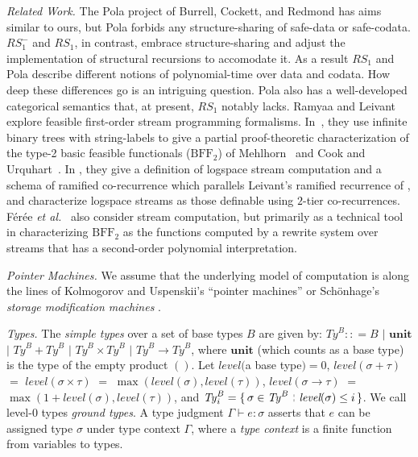 \documentclass[envcountsame]{llncs}
\newcommand{\Unit}{\ensuremath{\mathbf{unit}}\xspace}
\newcommand{\Ty}{\mathit{Ty}}
\newcommand{\RSi}{\mathit{RS_1}}
\newcommand{\RSmi}{\mathit{RS^-_1}}
\newcommand{\Topic}[1]{\smallskip\noindent{\textbf{#1{.}}}\enspace}
\newcommand{\set}[1]{\{\,#1\,\}}
\newcommand{\entails}{\vdash}
\newcommand{\suchthat}{\mathrel{\,\stackrel{\rule{0.03em}{0.5ex}}{\rule[-.1ex]{0.03em}{0.5ex}}\,}}
\newcommand{\is}{\ensuremath{\mathrel{\mathrel{:}\mathrel{:}=}}}
\newcommand{\of}{\colon}
\renewcommand{\colon}{\mathpunct{:}}
\newcommand{\level}{\textit{level}}
\begin{document}
\emph{Related Work.}
The Pola project of Burrell, Cockett, and Redmond
\cite{Burrell:2009,cockett:redmond:low:cat} has  aims similar to ours,
but Pola forbids any structure-sharing of safe-data or safe-codata.
$\RSmi$ and $\RSi$, in contrast, embrace structure-sharing and
adjust the implementation of structural recursions to accomodate it.
As a result $\RSi$ and Pola describe different notions of
polynomial-time over data and codata.  
How deep these differences go is an intriguing question.
Pola also has a well-developed categorical
semantics that,  at present, $\RSi$ notably lacks.
Ramyaa and Leivant \cite{Ramyaa:2010,Ramyaa:Leivant:2011} explore
feasible first-order stream programming formalisms.
In~\cite{Ramyaa:2010}, they use infinite binary trees with
string-labels to give a partial proof-theoretic characterization of
the type-2 basic feasible functionals ($\mathrm{BFF}_2$) of
Mehlhorn~\cite{Mehlhorn76} and Cook and
Urquhart~\cite{CookUrquhart:feasConstrArith}.  In
\cite{Ramyaa:Leivant:2011}, they give a definition of logspace
stream computation and a schema of ramified co-recurrence which
parallels Leivant's ramified recurrence of \cite{Leivant:FM2}, and
characterize logspace streams as those definable using $2$-tier
co-recurrences.  F\'{e}r\'{e}e \emph{et al.}~\cite{Feree:2010} also
consider stream computation, but primarily as a technical tool in
characterizing $\mathrm{BFF}_2$ as the functions computed by a
rewrite system over streams that has a second-order polynomial
interpretation.












\Topic{Background}
\emph{Pointer Machines.} 
We assume that the underlying model of computation is along the
lines of Kolmogorov and Uspenskii's 
``pointer machines'' or Sch\"{o}nhage's \emph{storage modification 
machines}
\cite{vanEmdeBoas90}.


\emph{Types.} The \emph{simple types} over a  set of base types $B$ are given by: 
$\Ty^B \is B$ $|$ $\Unit$ $|$ 
$\Ty^B+\Ty^B$ $|$ $\Ty^B\times\Ty^B$ $|$ $\Ty^B\to\Ty^B$, where $\Unit$ 
(which counts as a base type) is the type of the 
empty product $()$.  
Let $\level($a base type$)=0$, 
$\level(\sigma+\tau)$ $=$ $\level(\sigma\times\tau)$ 
$=$ $\max(\level(\sigma),\level(\tau))$,  
$\level(\sigma\to\tau)$ $=$ $\max(1+\level(\sigma),\level(\tau))$, 
and $\Ty_i^B = \set{\sigma\in\Ty^B \suchthat \level(\sigma)\leq i}$.
We call level-0 types 
\emph{ground types}.  
A type judgment $\Gamma\entails e\of\sigma$ asserts
that $e$ can be assigned type $\sigma$ under type context $\Gamma$,
where a \emph{type context} is a finite function from variables to types. 
\end{document}
